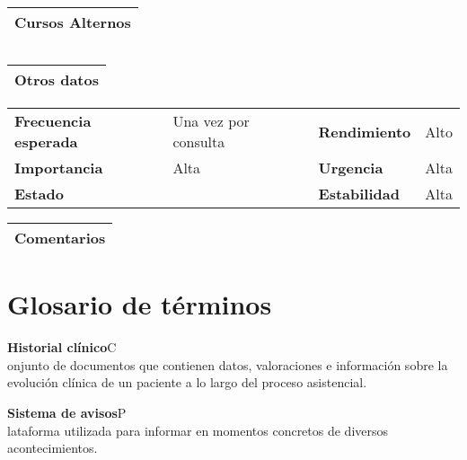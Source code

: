 \documentclass[11pt,a4paper]{article}
\newcommand{\term}[2]{\textbf{#1}\quad#2\\}
\begin{document}
\begin{table}[H]
	\begin{tabularx}{\textwidth}{X}
		\textbf{Cursos Alternos}\\ \hline
	\end{tabularx}
	\begin{tabularx}{\textwidth}{cX}
	\end{tabularx}
\end{table}

\begin{table}[H]
	\begin{tabularx}{\textwidth}{X}
		\textbf{Otros datos}\\ \hline
	\end{tabularx}
	\begin{tabularx}{\textwidth}{lXlX}
		\textbf{Frecuencia esperada} & Una vez por consulta & \textbf{Rendimiento} & Alto \\
		\textbf{Importancia} & Alta & \textbf{Urgencia} & Alta \\
		\textbf{Estado} &  & \textbf{Estabilidad} & Alta\\
	\end{tabularx}
	
	\begin{tabularx}{\textwidth}{X}
		\textbf{Comentarios}\\ \hline
	\end{tabularx}
\end{table}


\section{Glosario de términos}
\term{Historial clínico} Conjunto de documentos que contienen datos, valoraciones e información sobre la evolución clínica de un paciente a lo largo del proceso asistencial.

\term{Sistema de avisos} Plataforma utilizada para informar en momentos concretos de diversos acontecimientos.

\end{document}

